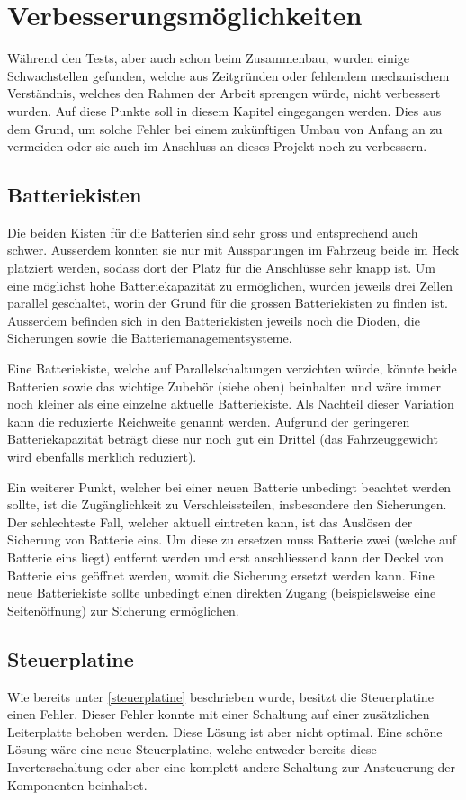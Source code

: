 \section{Verbesserungsmöglichkeiten}
\color{blue}
Während den Tests, aber auch schon beim Zusammenbau, wurden einige Schwachstellen gefunden, welche aus Zeitgründen oder fehlendem mechanischem Verständnis, welches den Rahmen der Arbeit sprengen würde, nicht verbessert wurden. Auf diese Punkte soll in diesem Kapitel eingegangen werden. Dies aus dem Grund, um solche Fehler bei einem zukünftigen Umbau von Anfang an zu vermeiden oder sie auch im Anschluss an dieses Projekt noch zu verbessern. 

\subsection{Batteriekisten}
Die beiden Kisten für die Batterien sind sehr gross und entsprechend auch schwer. Ausserdem konnten sie nur mit Aussparungen im Fahrzeug beide im Heck platziert werden, sodass dort der Platz für die Anschlüsse sehr knapp ist. Um eine möglichst hohe Batteriekapazität zu ermöglichen, wurden jeweils drei Zellen parallel geschaltet, worin der Grund für die grossen Batteriekisten zu finden ist. Ausserdem befinden sich in den Batteriekisten jeweils noch die Dioden, die Sicherungen sowie die Batteriemanagementsysteme.

Eine Batteriekiste, welche auf Parallelschaltungen verzichten würde, könnte beide Batterien sowie das wichtige Zubehör (siehe oben) beinhalten und wäre immer noch kleiner als eine einzelne aktuelle Batteriekiste. Als Nachteil dieser Variation kann die reduzierte Reichweite genannt werden. Aufgrund der geringeren Batteriekapazität beträgt diese nur noch gut ein Drittel (das Fahrzeuggewicht wird ebenfalls merklich reduziert).

Ein weiterer Punkt, welcher bei einer neuen Batterie unbedingt beachtet werden sollte, ist die Zugänglichkeit zu Verschleissteilen, insbesondere den Sicherungen. Der schlechteste Fall, welcher aktuell eintreten kann, ist das Auslösen der Sicherung von Batterie eins. Um diese zu ersetzen muss Batterie zwei (welche auf Batterie eins liegt) entfernt werden und erst anschliessend kann der Deckel von Batterie eins geöffnet werden, womit die Sicherung ersetzt werden kann. Eine neue Batteriekiste sollte unbedingt einen direkten Zugang (beispielsweise eine Seitenöffnung) zur Sicherung ermöglichen.

\subsection{Steuerplatine}
Wie bereits unter \ref{steuerplatine} beschrieben wurde, besitzt die Steuerplatine einen Fehler. Dieser Fehler konnte mit einer Schaltung auf einer zusätzlichen Leiterplatte behoben werden. Diese Lösung ist aber nicht optimal. Eine schöne Lösung wäre eine neue Steuerplatine, welche entweder bereits diese Inverterschaltung oder aber eine komplett andere Schaltung zur Ansteuerung der Komponenten beinhaltet.

